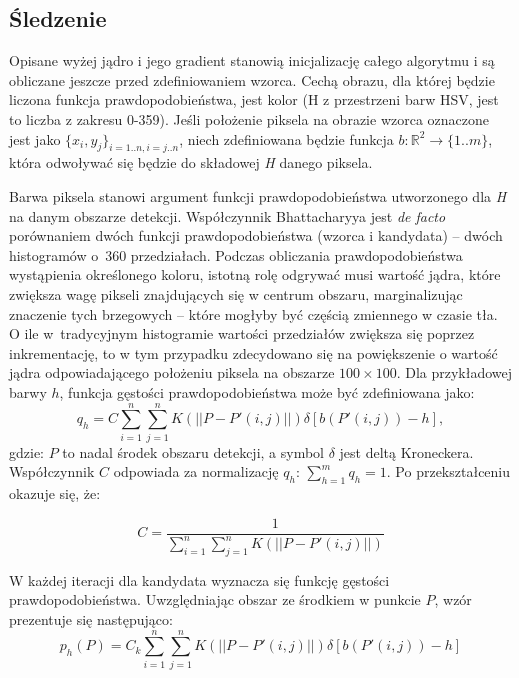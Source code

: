 \subsection{Śledzenie}

Opisane wyżej jądro i jego gradient stanowią inicjalizację całego algorytmu i są obliczane jeszcze przed zdefiniowaniem wzorca. 
Cechą obrazu, dla której będzie liczona funkcja prawdopodobieństwa, jest kolor (H z przestrzeni barw HSV, jest to liczba z zakresu 0-359). 
Jeśli położenie piksela na obrazie wzorca oznaczone jest jako $\{x_{i},y_{j}\}_{i=1..n,i=j..n}$, niech zdefiniowana będzie funkcja $b:\mathbb{R}^2\rightarrow\{1..m\}$, która odwoływać się będzie do składowej \textit{H} danego piksela.

Barwa piksela stanowi argument funkcji prawdopodobieństwa utworzonego dla \textit{H} na danym obszarze detekcji.
Współczynnik Bhattacharyya jest \textit{de facto} porównaniem dwóch funkcji prawdopodobieństwa (wzorca i kandydata) --  dwóch histogramów o~360 przedziałach. 
Podczas obliczania prawdopodobieństwa wystąpienia określonego koloru, istotną rolę odgrywać musi wartość jądra, które zwiększa wagę pikseli znajdujących się w centrum obszaru, marginalizując znaczenie tych brzegowych -- które mogłyby być częścią zmiennego w czasie tła. 
O ile w~tradycyjnym histogramie wartości przedziałów zwiększa się poprzez inkrementację, to w tym przypadku zdecydowano się na powiększenie o wartość jądra odpowiadającego położeniu piksela na obszarze $100 \times 100$.
Dla przykładowej barwy $h$, funkcja gęstości prawdopodobieństwa może być zdefiniowana jako:
\begin{equation}
q_h=C\sum_{i=1}^{n}\sum_{j=1}^{n}K(||P-P'(i,j)||)\delta[b(P'(i,j))-h],
\end{equation}
gdzie: $P$ to nadal środek obszaru detekcji, a symbol $\delta$ jest deltą Kroneckera. Współczynnik $C$ odpowiada za normalizację $q_h$: $\sum_{h=1}^{m}q_h=1$.
Po przekształceniu okazuje się, że:

\begin{equation}
C=\frac{1}{\sum_{i=1}^{n}\sum_{j=1}^{n}K(||P-P'(i,j)||)} 
\end{equation}

W każdej iteracji dla kandydata wyznacza się funkcję gęstości prawdopodobieństwa. 
Uwzględniając obszar ze środkiem w punkcie $P$, wzór prezentuje się następująco:
\begin{equation}
\label{eq:density}
p_h(P)=C_k\sum_{i=1}^{n}\sum_{j=1}^{n}K(||P-P'(i,j)||)\delta[b(P'(i,j))-h] 
\end{equation}

